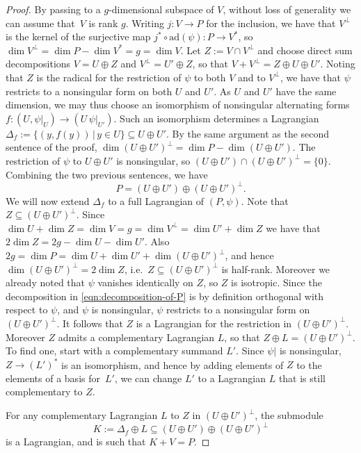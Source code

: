 \documentclass[10pt,a4paper]{amsart}
\begin{document}
\begin{proof}
By passing to a $g$-dimensional subspace of $V$, without loss of generality we can assume that~$V$ is rank $g$. Writing $j\colon V\to P$ for the inclusion, we have that $V^\perp$ is the kernel of the surjective map $j^*\circ \mathrm{ad}(\psi)\colon P\to V^*$, so  $\dim V^\perp=\dim P-\dim V^*=g = \dim V$. Let $Z:=V\cap V^\perp$ and choose direct sum decompositions $V=U\oplus Z$ and $V^\perp=U'\oplus Z$, so that $V+V^\perp=Z\oplus U\oplus U'$. Noting that $Z$ is the radical for the restriction of $\psi$ to both $V$ and to $V^\perp$, we have that $\psi$ restricts to a nonsingular form on both $U$ and $U'$. As $U$ and $U'$ have the same dimension, we may thus choose an isomorphism of nonsingular alternating forms $f\colon (U,\psi|_U)\to (U\,\psi|_{U'})$. Such an isomorphism determines a Lagrangian $\Delta_f:=\{(y,f(y))\,|\,y\in U\}\subseteq U\oplus U'$.  By the same argument as the second sentence of the proof, $\dim(U \oplus U')^{\perp} = \dim P - \dim(U \oplus U')$. 
The restriction of $\psi$ to $U\oplus U'$ is nonsingular, so $(U\oplus U')\cap (U\oplus U')^\perp=\{0\}$. Combining the two previous sentences, we have 
\begin{equation}\label{eqn:decomposition-of-P}
P=(U\oplus U')\oplus (U\oplus U')^\perp.
\end{equation}
We will now extend $\Delta_f$ to a full Lagrangian of $(P,\psi)$. Note that $Z\subseteq (U\oplus U')^\perp$. 
Since $\dim U + \dim Z = \dim V = g = \dim V^{\perp} = \dim U' + \dim Z$ we have that $2 \dim Z = 2g-\dim U - \dim U'$. Also $2g = \dim P = \dim U + \dim U' + \dim (U\oplus U')^{\perp}$, and hence $\dim (U\oplus U')^{\perp} = 2 \dim Z$, i.e.\ $Z\subseteq (U\oplus U')^\perp$ is half-rank.  Moreover we already noted that $\psi$ vanishes identically on $Z$, so $Z$ is isotropic.  
Since the decomposition in \eqref{eqn:decomposition-of-P} is by definition orthogonal with respect to $\psi$, and $\psi$ is nonsingular, $\psi$ restricts to a nonsingular form on $(U\oplus U')^\perp$.  It follows that $Z$ is a Lagrangian for the restriction in $(U\oplus U')^\perp$. Moreover $Z$ admits a complementary Lagrangian $L$,  so that $Z\oplus L= (U\oplus U')^\perp$.  
To find one,  start with a complementary summand $L'$. Since $\psi|$ is nonsingular, $Z \to (L')^*$ is an isomorphism, and hence by adding elements of $Z$ to the elements of a basis for~$L'$, we can change $L'$ to a Lagrangian $L$ that is still complementary to $Z$. 

For any complementary Lagrangian $L$ to $Z$ in $(U\oplus U')^\perp$, the submodule
\[
K:=\Delta_f\oplus L\subseteq (U\oplus U')\oplus (U\oplus U')^\perp
\]
is a Lagrangian, and is such that $K+V=P$.
\end{proof}
\end{document}
